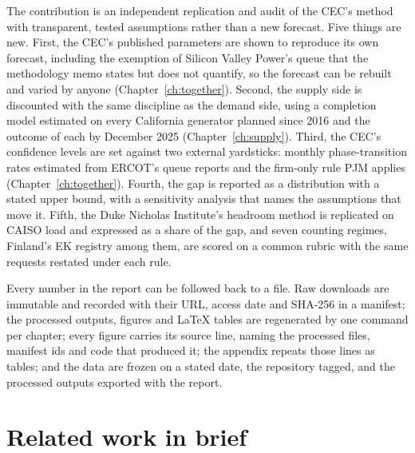 The contribution is an independent replication and audit of the CEC's method with transparent, tested assumptions rather than a new forecast. Five things are new. First, the CEC's published parameters are shown to reproduce its own forecast, including the exemption of Silicon Valley Power's queue that the methodology memo states but does not quantify, so the forecast can be rebuilt and varied by anyone (Chapter~\ref{ch:together}). Second, the supply side is discounted with the same discipline as the demand side, using a completion model estimated on every California generator planned since 2016 and the outcome of each by December 2025 (Chapter~\ref{ch:supply}). Third, the CEC's confidence levels are set against two external yardsticks: monthly phase-transition rates estimated from ERCOT's queue reports and the firm-only rule PJM applies (Chapter~\ref{ch:together}). Fourth, the gap is reported as a distribution with a stated upper bound, with a sensitivity analysis that names the assumptions that move it. Fifth, the Duke Nicholas Institute's headroom method is replicated on CAISO load and expressed as a share of the gap, and seven counting regimes, Finland's EK registry among them, are scored on a common rubric with the same requests restated under each rule.

Every number in the report can be followed back to a file. Raw downloads are immutable and recorded with their URL, access date and SHA-256 in a manifest; the processed outputs, figures and LaTeX tables are regenerated by one command per chapter; every figure carries its source line, naming the processed files, manifest ids and code that produced it; the appendix repeats those lines as tables; and the data are frozen on a stated date, the repository tagged, and the processed outputs exported with the report.

\section{Related work in brief}

